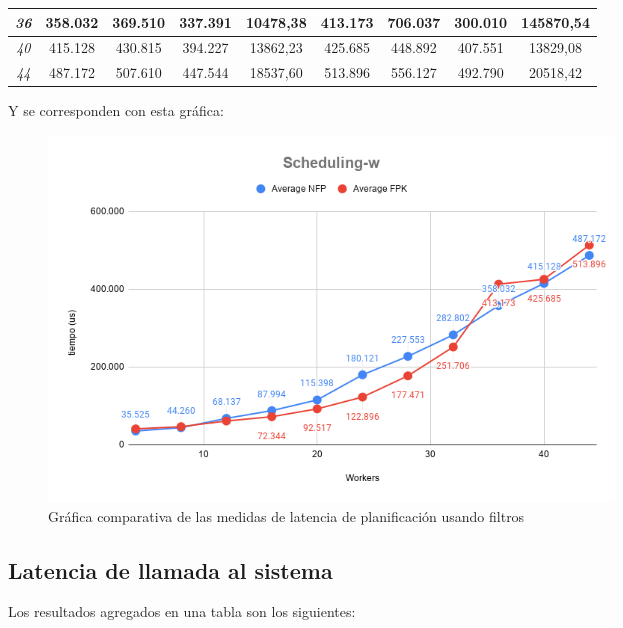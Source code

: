 \documentclass[../main.tex]{subfiles}
\begin{document}
\begin{table}[htp]
\begin{tabular}{|c|c|c|c|c|c|c|c|c|}
\textit{36}                          & 358.032      & 369.510      & 337.391      & 10478,38         & 413.173      & 706.037      & 300.010      & 145870,54        \\ \hline
\textit{40}                          & 415.128      & 430.815      & 394.227      & 13862,23         & 425.685      & 448.892      & 407.551      & 13829,08         \\ \hline
\textit{44}                          & 487.172      & 507.610      & 447.544      & 18537,60         & 513.896      & 556.127      & 492.790      & 20518,42         \\ \hline
\end{tabular}
\end{table}

Y se corresponden con esta gráfica:

\begin{figure}[htp]
    \centering
    \includegraphics[width=15cm]{imagenes/graficas/Scheduling-w.png}
    \caption{Gráfica comparativa de las medidas de latencia de planificación usando filtros}
\end{figure}


\subsection{Latencia de llamada al sistema}

Los resultados agregados en una tabla son los siguientes:
\end{document}
